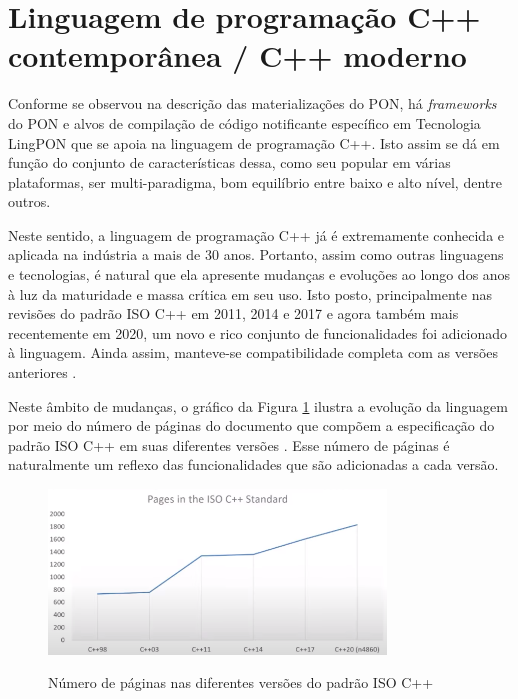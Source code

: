 \section{Linguagem de programação C++ contemporânea / C++ moderno}\label{sec:cpp_moderno}

Conforme se observou na descrição das materializações do PON, há
\textit{frameworks} do PON e alvos de compilação de código notificante
específico em Tecnologia LingPON que se apoia na linguagem de programação C++.
Isto assim se dá em função do conjunto de características dessa, como seu
popular em várias plataformas, ser multi-paradigma, bom equilíbrio entre baixo e
alto nível, dentre outros.

Neste sentido, a linguagem de programação C++ já é extremamente conhecida e
aplicada na indústria a mais de 30 anos. Portanto, assim como outras linguagens
e tecnologias, é natural que ela apresente mudanças e evoluções ao longo dos
anos à luz da maturidade e massa crítica em seu uso. Isto posto, principalmente
nas revisões do padrão ISO C++ em 2011, 2014 e 2017 e agora também mais
recentemente em 2020, um novo e rico conjunto de funcionalidades foi adicionado
à linguagem. Ainda assim, manteve-se compatibilidade completa com as versões
anteriores \cite{bjarne_2020}.

Neste âmbito de mudanças, o gráfico da Figura \ref{fig:iso_cpp} ilustra a
evolução da linguagem por meio do número de páginas do documento que compõem a
especificação do padrão ISO C++ em suas diferentes versões
\cite{iso_cpp17,feldman_2019}. Esse número de páginas é naturalmente um reflexo
das funcionalidades que são adicionadas a cada versão.

\begin{figure}[!htb]
  \centering
  \caption{Número de páginas nas diferentes versões do padrão ISO C++}
  \includegraphics[width=0.8\textwidth]{../figures/iso_cpp.png}
  \smallskip
  \label{fig:iso_cpp}
\end{figure}

